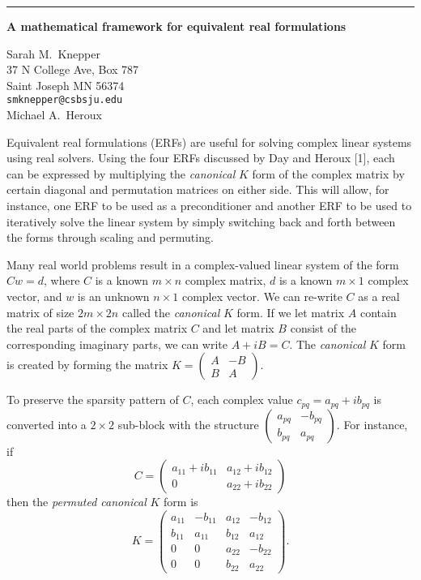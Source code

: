 \documentclass[twosided]{report}
\newcommand{\TwoMatrx}[4]{ \left(
	\begin{array}{cc}
	#1 & #2 \\
	#3 & #4
	\end{array}
	\right) }
\begin{document}
	\begin{center} \rule{6in}{1pt} \end{center}

\begin{center}
{\large			%
{\bf A mathematical framework for equivalent real formulations}}

	Sarah M.~Knepper \\
	37 N College Ave, Box 787 \\
	Saint Joseph MN 56374 \\
	{\tt smknepper@csbsju.edu} \\
	Michael A.~Heroux
\end{center}
Equivalent real formulations (ERFs) are useful for solving
complex linear systems using real solvers. Using the four
ERFs discussed by Day and Heroux [1], each can be
expressed by multiplying the \emph{canonical} $K$ form of
the complex matrix by certain diagonal and permutation
matrices on either side. This will allow, for instance, one
ERF to be used as a preconditioner and another ERF to be
used to iteratively solve the linear system by simply
switching back and forth between the forms through scaling
and permuting.

Many real world problems result in a
complex-valued linear system of the form
$C w = d$, where $C$ is a known
$m\times n$ complex matrix, $d$ is a known $m\times 1$
complex vector, and $w$ is an unknown $n\times 1$
complex vector. We
can re-write $C$ as a real matrix of size $2m\times 2n$
called the \emph{canonical} $K$ form. If we let matrix $A$
contain the real parts of the complex matrix $C$ and let
matrix $B$ consist of the corresponding imaginary parts, we
can write $A + i B = C$.
The \emph{canonical} $K$ form is created by
forming the matrix
$K = \TwoMatrx{A}{-B}{B}{A}$.

To preserve the sparsity pattern of $C$,
each complex value $c_{pq} = a_{pq} + ib_{pq}$ is converted
into a $2\times 2$ sub-block with the structure
$ \TwoMatrx{a_{pq}}{-b_{pq}}{b_{pq}}{a_{pq}}.$
For instance, if
$$C = \TwoMatrx{a_{11} + i b_{11}}{a_{12} + i b_{12}}{0}{a_{22} + i b_{22}}$$
then the \emph{permuted canonical} $K$ form is
$$K = \left(
\begin{array}{cccc} a_{11} & -b_{11} & a_{12} & -b_{12} \\
b_{11} & a_{11} & b_{12} & a_{12} \\ 0 & 0 & a_{22} &
-b_{22} \\ 0 & 0 & b_{22} & a_{22} \end{array} \right).
$$
\end{document}
